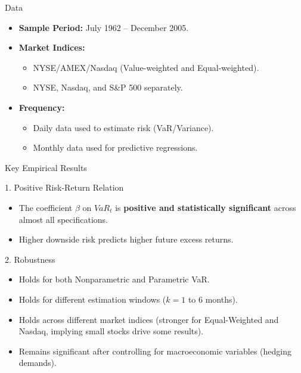 \documentclass{beamer}
\begin{document}
\begin{frame}{Data}
    \begin{itemize}
        \item \textbf{Sample Period:} July 1962 -- December 2005.
        \item \textbf{Market Indices:}
            \begin{itemize}
                \item NYSE/AMEX/Nasdaq (Value-weighted and Equal-weighted).
                \item NYSE, Nasdaq, and S\&P 500 separately.
            \end{itemize}
        \item \textbf{Frequency:} 
            \begin{itemize}
                \item Daily data used to estimate risk (VaR/Variance).
                \item Monthly data used for predictive regressions.
            \end{itemize}
    \end{itemize}
\end{frame}

\begin{frame}{Key Empirical Results}
    \begin{block}{1. Positive Risk-Return Relation}
        \begin{itemize}
            \item The coefficient $\beta$ on $VaR_t$ is \textbf{positive and statistically significant} across almost all specifications.
            \item Higher downside risk predicts higher future excess returns.
        \end{itemize}
    \end{block}

    \begin{block}{2. Robustness}
        \begin{itemize}
            \item Holds for both Nonparametric and Parametric VaR.
            \item Holds for different estimation windows ($k=1$ to $6$ months).
            \item Holds across different market indices (stronger for Equal-Weighted and Nasdaq, implying small stocks drive some results).
            \item Remains significant after controlling for macroeconomic variables (hedging demands).
        \end{itemize}
    \end{block}
\end{frame}
\end{document}
